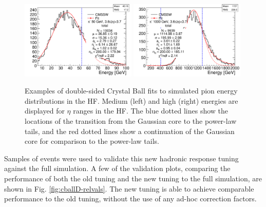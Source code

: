 \begin{figure}[hbtp]
\begin{center}
\includegraphics[width=0.49\textwidth]{figures/pion_response_tot_cballD_50gev_ieta37.pdf}
\includegraphics[width=0.49\textwidth]{figures/pion_response_tot_cballD_1000gev_ieta37.pdf}
\caption{Examples of double-sided Crystal Ball fits to simulated pion energy distributions in the HF. Medium (left) and high (right) energies are displayed for $\eta$ ranges in the HF. The blue dotted lines show the locations of the transition from the Gaussian core to the power-law tails, and the red dotted lines show a continuation of the Gaussian core for comparison to the power-law tails.}
\label{fig:cballD-fits-HF}
\end{center}
\end{figure}

Samples of \ttbar events were used to validate this new hadronic response tuning against the full simulation. A few of the validation plots, comparing the performance of both the old tuning and the new tuning to the full simulation, are shown in Fig. \ref{fig:cballD-relvals}. The new tuning is able to achieve comparable performance to the old tuning, without the use of any ad-hoc correction factors.

